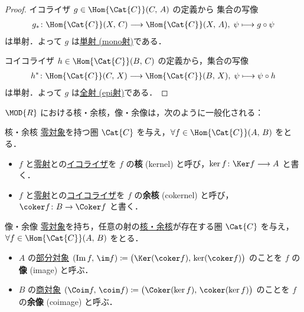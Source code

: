 \documentclass[algtopo_main]{subfiles}
\begin{document}
\begin{proof}
    イコライザ $g \in \Hom{\Cat{C}}(C,\, A)$  の定義から
    集合の写像
    \begin{align}
        g_* \colon \Hom{\Cat{C}} (X,\, C) \lto \Hom{\Cat{C}} (X,\, A),\; \psi \lmto g \circ \psi
    \end{align}
    は単射．よって $g$ は\hyperref[def:mono-epi]{単射 (mono射)}である．

    コイコライザ $h \in \Hom{\Cat{C}}(B,\, C)$  の定義から，集合の写像
    \begin{align}
        h^* \colon \Hom{\Cat{C}} (C,\, X) \lto \Hom{\Cat{C}} (B,\, X),\; \psi \lmto \psi \circ h
    \end{align}
    は単射．よって $g$ は\hyperref[def:mono-epi]{全射 (epi射)}である．
\end{proof}

$\MOD{R}$ における核・余核，像・余像は，次のように一般化される：

\begin{mydef}[label=def:ker-coker]{核・余核}
    \hyperref[def:init-final-zero]{零対象}を持つ圏 $\Cat{C}$ を与え，$\forall f \in \Hom{\Cat{C}} (A,\, B)$ をとる．
    \begin{itemize}
        \item $f$ と\hyperref[def:init-final-zero]{零射}との\hyperref[def:equalizer]{イコライザ}を $f$ の\textbf{核} (kernel) と呼び，$\ker f \colon \Ker f \lto A$ と書く．
        \item $f$ と\hyperref[def:init-final-zero]{零射}との\hyperref[def:coequalizer]{コイコライザ}を $f$ の\textbf{余核} (cokernel) と呼び，$\coker f \colon B \to \Coker f$ と書く．
    \end{itemize}
\end{mydef}

\begin{mydef}[label=def:im-coim]{像・余像}
    \hyperref[def:init-final-zero]{零対象}を持ち，任意の射の\hyperref[def:ker-coker]{核・余核}が存在する圏 $\Cat{C}$ を与え，$\forall f \in \Hom{\Cat{C}}(A,\, B)$ をとる．
    \begin{itemize}
        \item $A$ の\hyperref[def:sub]{部分対象} $(\Im f,\, \im f) \coloneqq \bigl( \Ker (\coker f),\, \ker (\coker f) \bigr)$ のことを $f$ の\textbf{像} (image) と呼ぶ．
        \item $B$ の\hyperref[def:quo]{商対象} $(\Coim f,\, \coim f) \coloneqq \bigl( \Coker (\ker f),\, \coker (\ker f) \bigr)$ のことを $f$ の\textbf{余像} (coimage) と呼ぶ．
    \end{itemize}
\end{mydef}
\end{document}
